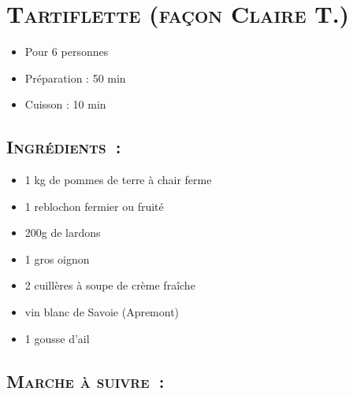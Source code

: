 \section[\normalsize{Tartiflette (fa\c con Claire T.)}]{\LARGE{\textsc{Tartiflette (fa\c con Claire T.)}}}		%


\begin{itemize}
\item Pour 6 personnes
\item Préparation : 50 min
\item Cuisson : 10 min
\end{itemize}

\subsection*{\textsc{Ingr\'edients~:}}

\begin{itemize}
\item 1 kg de pommes de terre \`a chair ferme
\item 1 reblochon fermier ou fruit\'e
\item 200g de lardons
\item 1 gros oignon
\item 2 cuill\`eres \`a soupe de cr\`eme fra\^iche
\item vin blanc de Savoie (Apremont)
\item 1 gousse d'ail
\end{itemize}


\subsection*{\textsc{Marche \`a suivre~:}}

